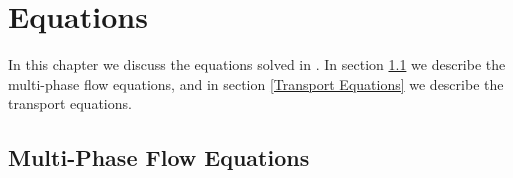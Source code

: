 
\chapter{Equations}
\label{Equations}

In this chapter we discuss the equations solved in \parflow{}.
In section \ref{Multi-Phase Flow Equations} we describe the multi-phase
flow equations, and in section \ref{Transport Equations} we describe
the transport equations.

\section{Multi-Phase Flow Equations}
\label{Multi-Phase Flow Equations}

